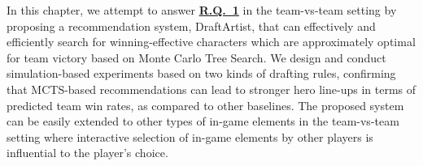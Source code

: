 In this chapter, we attempt to answer \hyperref[rq1]{\textbf{R.Q.~1}} in the team-vs-team setting by proposing a recommendation system, DraftArtist, that can effectively and efficiently search for winning-effective characters which are  approximately optimal for team victory based on Monte Carlo Tree Search. We design and conduct simulation-based experiments based on two kinds of drafting rules, confirming that MCTS-based recommendations can lead to stronger hero line-ups in terms of predicted team win rates, as compared to other baselines. The proposed system can be easily extended to other types of in-game elements in the team-vs-team setting where interactive selection of in-game elements by other players is influential to the player's choice. 



